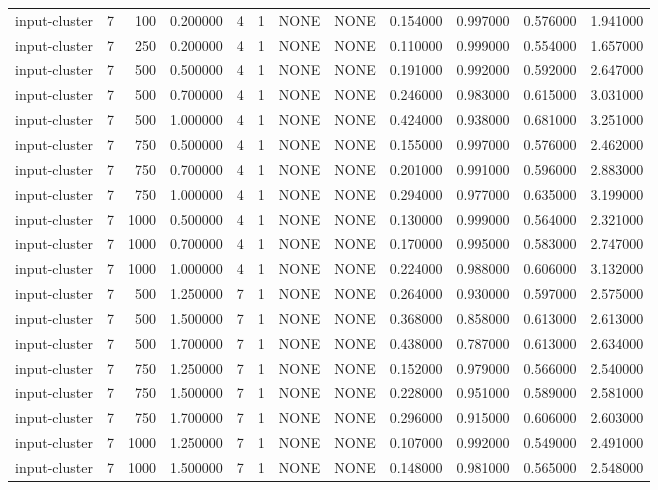 \begin{tabular}{lrrrllllrrrr}
input-cluster & 7 & 100 & 0.200000 & 4 & 1 & NONE & NONE & 0.154000 & 0.997000 & 0.576000 & 1.941000 \\
input-cluster & 7 & 250 & 0.200000 & 4 & 1 & NONE & NONE & 0.110000 & 0.999000 & 0.554000 & 1.657000 \\
input-cluster & 7 & 500 & 0.500000 & 4 & 1 & NONE & NONE & 0.191000 & 0.992000 & 0.592000 & 2.647000 \\
input-cluster & 7 & 500 & 0.700000 & 4 & 1 & NONE & NONE & 0.246000 & 0.983000 & 0.615000 & 3.031000 \\
input-cluster & 7 & 500 & 1.000000 & 4 & 1 & NONE & NONE & 0.424000 & 0.938000 & 0.681000 & 3.251000 \\
input-cluster & 7 & 750 & 0.500000 & 4 & 1 & NONE & NONE & 0.155000 & 0.997000 & 0.576000 & 2.462000 \\
input-cluster & 7 & 750 & 0.700000 & 4 & 1 & NONE & NONE & 0.201000 & 0.991000 & 0.596000 & 2.883000 \\
input-cluster & 7 & 750 & 1.000000 & 4 & 1 & NONE & NONE & 0.294000 & 0.977000 & 0.635000 & 3.199000 \\
input-cluster & 7 & 1000 & 0.500000 & 4 & 1 & NONE & NONE & 0.130000 & 0.999000 & 0.564000 & 2.321000 \\
input-cluster & 7 & 1000 & 0.700000 & 4 & 1 & NONE & NONE & 0.170000 & 0.995000 & 0.583000 & 2.747000 \\
input-cluster & 7 & 1000 & 1.000000 & 4 & 1 & NONE & NONE & 0.224000 & 0.988000 & 0.606000 & 3.132000 \\
input-cluster & 7 & 500 & 1.250000 & 7 & 1 & NONE & NONE & 0.264000 & 0.930000 & 0.597000 & 2.575000 \\
input-cluster & 7 & 500 & 1.500000 & 7 & 1 & NONE & NONE & 0.368000 & 0.858000 & 0.613000 & 2.613000 \\
input-cluster & 7 & 500 & 1.700000 & 7 & 1 & NONE & NONE & 0.438000 & 0.787000 & 0.613000 & 2.634000 \\
input-cluster & 7 & 750 & 1.250000 & 7 & 1 & NONE & NONE & 0.152000 & 0.979000 & 0.566000 & 2.540000 \\
input-cluster & 7 & 750 & 1.500000 & 7 & 1 & NONE & NONE & 0.228000 & 0.951000 & 0.589000 & 2.581000 \\
input-cluster & 7 & 750 & 1.700000 & 7 & 1 & NONE & NONE & 0.296000 & 0.915000 & 0.606000 & 2.603000 \\
input-cluster & 7 & 1000 & 1.250000 & 7 & 1 & NONE & NONE & 0.107000 & 0.992000 & 0.549000 & 2.491000 \\
input-cluster & 7 & 1000 & 1.500000 & 7 & 1 & NONE & NONE & 0.148000 & 0.981000 & 0.565000 & 2.548000 \\

\end{tabular}
